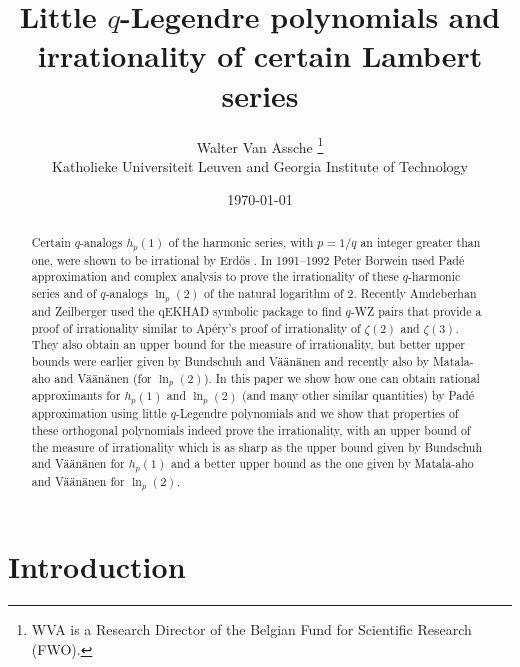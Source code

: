 \documentclass[12pt]{article}
\begin{document}
\title{Little $q$-Legendre polynomials and irrationality of certain
Lambert series}
\author{Walter Van Assche
\thanks{WVA is a Research Director of the Belgian Fund for Scientific Research 
(FWO).}
\\
\normalsize{Katholieke Universiteit Leuven and Georgia Institute of Technology}}
\date{\today}
\maketitle

\begin{abstract}
Certain $q$-analogs $h_p(1)$ of the harmonic series, with $p=1/q$ an integer 
greater than one, were shown to be irrational by
Erd\H{o}s \cite{erdos}. In 1991--1992 Peter Borwein \cite{bor1} \cite{bor2}
 used Pad\'e approximation
and complex analysis to prove the irrationality of these $q$-harmonic series
and of $q$-analogs $\ln_p(2)$ of the natural logarithm of 2. Recently
Amdeberhan and Zeilberger \cite{WZ} used the qEKHAD symbolic package to find
$q$-WZ pairs that provide a proof of irrationality similar to Ap\'ery's
proof of irrationality of $\zeta(2)$ and $\zeta(3)$. They also obtain
an upper bound for the measure of irrationality, but  better upper
bounds were earlier given by Bundschuh and V\"a\"an\"anen \cite{BV} and recently
also by Matala-aho and V\"a\"an\"anen \cite{MV} (for $\ln_p(2)$). 
In this paper we show how one can obtain
rational approximants for $h_p(1)$ and $\ln_p(2)$ (and many other
similar quantities) by  Pad\'e approximation using
 little $q$-Legendre polynomials
and we show that properties of these orthogonal polynomials indeed
prove the irrationality, with an upper bound of the measure
of irrationality  which is as sharp as the upper bound given by
Bundschuh and V\"a\"an\"anen for $h_p(1)$ and a
better upper bound as the one given by Matala-aho and V\"a\"an\"anen
for $\ln_p(2)$.
\end{abstract} 
 


\section{Introduction}
\end{document}
